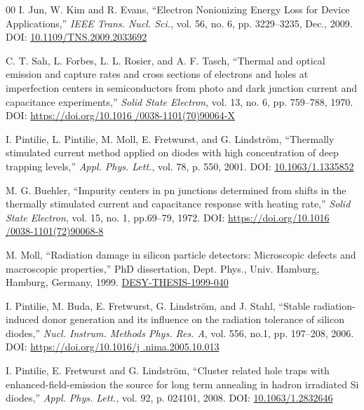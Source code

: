 \documentclass[final, 5p, times]{elsarticle}
\begin{document}
\begin{thebibliography}{00}
 I. Jun, W. Kim and R. Evans, ``Electron Nonionizing Energy Loss
for Device Applications,'' \textit{IEEE Trans. Nucl. Sci.}, vol. 56, no. 6, pp.
3229--3235, Dec., 2009. 
DOI:
\href{https://ieeexplore.ieee.org/document/5341364?reload=true&arnumber=5341364
}{10.1109/TNS.2009.2033692}

 C. T. Sah, L. Forbes, L. L. Rosier, and A. F. Tasch, ``Thermal
and optical emission and capture rates and cross sections of electrons and
holes at imperfection centers in semiconductors from photo and dark junction
current and capacitance experiments,'' \textit{Solid State Electron}, vol. 13,
no. 6, pp. 759--788, 1970.
DOI:
\href{https://doi.org/10.1016/0038-1101(70)90064-X}{https://doi.org/10.1016
/0038-1101(70)90064-X}

 I. Pintilie, L. Pintilie, M. Moll, E. Fretwurst, and G.
Lindstr\"om, ``Thermally stimulated current method applied on diodes with high
concentration of deep trapping levels,'' \textit {Appl. Phys. Lett.}, vol. 78,
p. 550, 2001.
DOI: \href{https://doi.org/10.1063/1.1335852}{10.1063/1.1335852}

 M. G. Buehler, ``Impurity centers in pn junctions determined from
shifts in the thermally stimulated current and capacitance response with
heating rate,'' \textit{Solid State Electron}, vol. 15, no. 1, pp.69--79, 
1972.
DOI:
\href{https://doi.org/10.1016/0038-1101(72)90068-8}{https://doi.org/10.1016
/0038-1101(72)90068-8}

 M. Moll, ``Radiation damage in silicon particle detectors:
Microscopic defects and macroscopic properties,'' PhD dissertation, Dept.
Phys., Univ. Hamburg, Hamburg, Germany, 1999.
\href{https://bib-pubdb1.desy.de/record/300958}{DESY-THESIS-1999-040}

 I. Pintilie, M. Buda, E. Fretwurst, G. Lindstr\"om, and J. Stahl,
``Stable radiation-induced donor generation and its influence on the radiation
tolerance of silicon diodes,'' \textit{Nucl. Instrum. Methods Phys. Res. A},
vol. 556, no.1, pp. 197--208, 2006.
DOI:
\href{https://doi.org/10.1016/j.nima.2005.10.013}{https://doi.org/10.1016/j
.nima.2005.10.013}

 I. Pintilie, E. Fretwurst and G. Lindstr\"om, ``Cluster related
hole traps with enhanced-field-emission the source for long term annealing in
hadron irradiated Si diodes,'' \textit {Appl. Phys. Lett.}, vol. 92, p. 024101,
2008.
DOI:
\href{https://aip.scitation.org/doi/full/10.1063/1.2832646}{10.1063/1.2832646}


\end{thebibliography}
\end{document}
